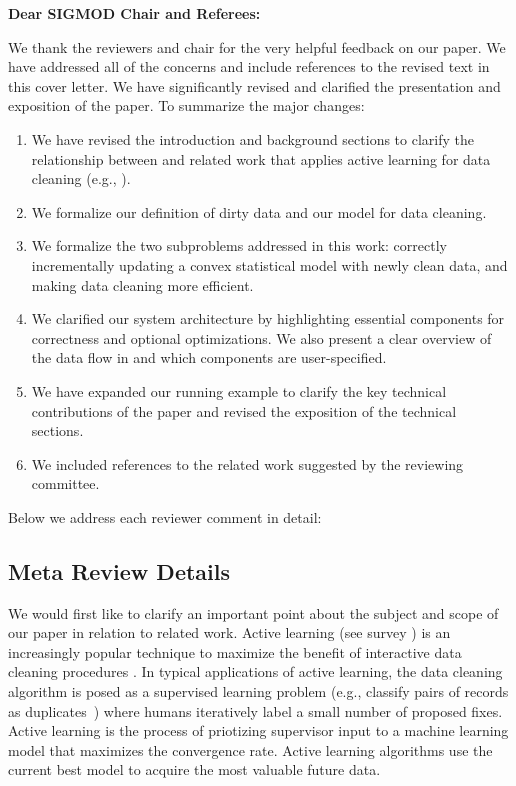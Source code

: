 {\noindent \normalsize \bf Dear SIGMOD Chair and Referees: }

\vspace{.5em}

We thank the reviewers and chair for the very helpful feedback on our paper. We have addressed all of the concerns and include references to the revised text in this cover letter. 
We have significantly revised and clarified the presentation and exposition
of the paper.
To summarize the major changes:
\begin{enumerate}
\item We have revised the introduction and background sections to clarify the relationship between \sys and related work that applies active learning for data cleaning (e.g., \cite{gokhale2014corleone, DBLP:journals/pvldb/YakoutENOI11, yakout2013don}).

\item We formalize our definition of dirty data and our model for data cleaning.

\item We formalize the two subproblems addressed in this work: correctly incrementally updating a convex statistical model with newly clean data, and making data cleaning more efficient.

\item We clarified our system architecture by highlighting essential components for correctness and optional optimizations. We also present a clear overview of the data flow in \sys and which components are user-specified.

\item We have expanded our running example to clarify the key technical contributions of the paper and revised the exposition of the technical sections.

\item We included references to the related work suggested by the reviewing committee.
\end{enumerate}
Below we address each reviewer comment in detail:

\vspace{0.5em}

\subsection*{Meta Review Details} 

We would first like to clarify an important point about the subject and scope of our paper in relation to related work.
Active learning (see survey \cite{settles2010active}) is an increasingly popular technique to maximize the benefit of interactive data cleaning procedures \cite{DBLP:journals/pvldb/YakoutENOI11, gokhale2014corleone, yakout2013don, DBLP:journals/pvldb/HaasKWF015}.
In typical applications of active learning, the data cleaning algorithm is posed as a supervised learning problem (e.g., classify pairs of records as duplicates~\cite{gokhale2014corleone}) where humans iteratively label a small number of proposed fixes.
Active learning is the process of priotizing supervisor input to a machine learning model that maximizes the convergence rate.
Active learning algorithms use the current best model to acquire the most valuable future data.

